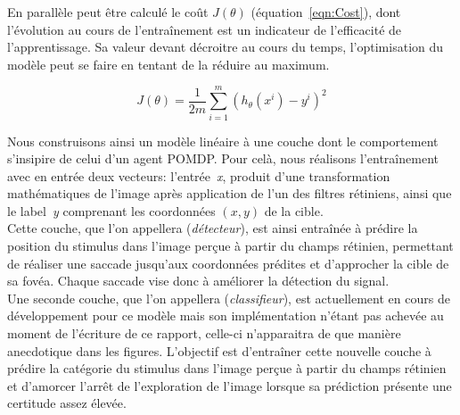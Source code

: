En parallèle peut être calculé le coût $J(\theta)$ (équation~\ref{eqn:Cost}), dont l'évolution au cours de l'entraînement est un indicateur de l'efficacité de l'apprentissage. Sa valeur devant décroitre au cours du temps, l'optimisation du modèle peut se faire en tentant de la réduire au maximum.

\begin{equation}
J(\theta) = \frac{1}{2m} \sum_{i=1}^m (h_\theta(x^i)-y^i)^2
\label{eqn:Cost}
\end{equation}

Nous construisons ainsi un modèle linéaire à une couche dont le comportement s'insipire de celui d'un agent POMDP. Pour celà, nous réalisons l'entraînement avec en entrée deux vecteurs: l'entrée~\textit{x}, produit d'une transformation mathématiques de l'image après application de l'un des filtres rétiniens, ainsi que le label~\textit{y} comprenant les coordonnées $(x,y)$ de la cible.\\
Cette couche, que l'on appellera (\textit{détecteur}), est ainsi entraînée à prédire la position du stimulus dans l'image perçue à partir du champs rétinien, permettant de réaliser une saccade jusqu'aux coordonnées prédites et d'approcher la cible de sa fovéa. Chaque saccade vise donc à améliorer la détection du signal.\autocite{Friston2012}\\
Une seconde couche, que l'on appellera (\textit{classifieur}), est actuellement en cours de développement pour ce modèle mais son implémentation n'étant pas achevée au moment de l'écriture de ce rapport, celle-ci n'apparaitra de que manière anecdotique dans les figures. L'objectif est d'entraîner cette nouvelle couche à prédire la catégorie du stimulus dans l'image perçue à partir du champs rétinien et d'amorcer l'arrêt de l'exploration de l'image lorsque sa prédiction présente une certitude assez élevée.